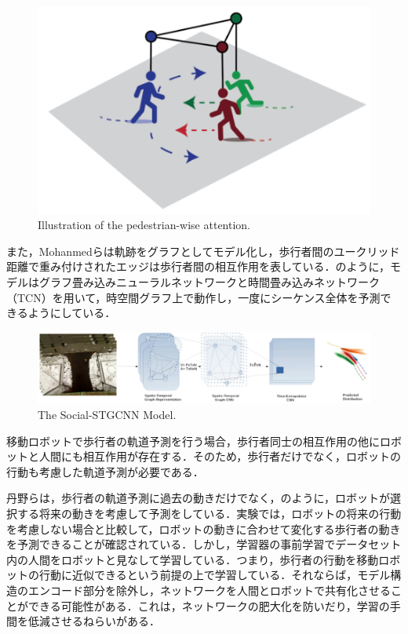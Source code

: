\begin{figure}[hbtp]
     \centering
    \includegraphics[keepaspectratio, scale=0.4]
         {images/s-bigat.png}
    \caption{Illustration of the pedestrian-wise attention.\protect\footnotemark[3]}
    \label{Fig:s-bigat}
\end{figure}

\protect{}

また，Mohanmedら\cite{s-stgcnn}は軌跡をグラフとしてモデル化し，歩行者間のユークリッド距離で重み付けされたエッジは歩行者間の相互作用を表している．のように，モデルはグラフ畳み込みニューラルネットワークと時間畳み込みネットワーク（TCN）を用いて，時空間グラフ上で動作し，一度にシーケンス全体を予測できるようにしている．

\begin{figure}[hbtp]
     \centering
    \includegraphics[keepaspectratio, scale=0.39]
         {images/s-stgcnn.png}
    \caption{The Social-STGCNN Model.\protect\footnotemark[4]}
    \label{Fig:s-stgcnn}
\end{figure}

\protect{}

\newpage

移動ロボットで歩行者の軌道予測を行う場合，歩行者同士の相互作用の他にロボットと人間にも相互作用が存在する．そのため，歩行者だけでなく，ロボットの行動も考慮した軌道予測が必要である．

丹野ら\cite{future-robot}は，歩行者の軌道予測に過去の動きだけでなく，のように，ロボットが選択する将来の動きを考慮して予測をしている．実験では，ロボットの将来の行動を考慮しない場合と比較して，ロボットの動きに合わせて変化する歩行者の動きを予測できることが確認されている．しかし，学習器の事前学習でデータセット内の人間をロボットと見なして学習している．つまり，歩行者の行動を移動ロボットの行動に近似できるという前提の上で学習している．それならば，モデル構造のエンコード部分を除外し，ネットワークを人間とロボットで共有化させることができる可能性がある．これは，ネットワークの肥大化を防いだり，学習の手間を低減させるねらいがある．

